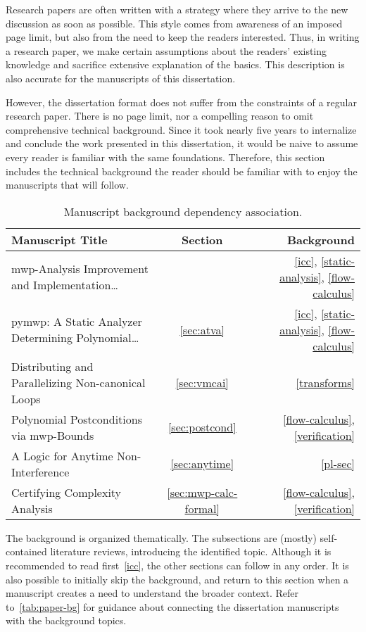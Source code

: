 
Research papers are often written with a strategy where they arrive to the new discussion as soon as possible.
This style comes from awareness of an imposed page limit, but also from the need to keep the readers interested.
Thus, in writing a research paper, we make certain assumptions about the readers' existing knowledge and sacrifice extensive explanation of the basics.
This description is also accurate for the manuscripts of this dissertation.

However, the dissertation format does not suffer from the constraints of a regular research paper.
There is no page limit, nor a compelling reason to omit comprehensive technical background.
Since it took nearly five years to internalize and conclude the work presented in this dissertation, it would be naive to assume every reader is familiar with the same foundations.
Therefore, this section includes the technical background the reader should be familiar with to enjoy the manuscripts that will follow.

\begin{table}[h!]
\begin{NiceTabularX}{\linewidth}{@{}Xcr@{}}
\toprule
\textbf{Manuscript Title} & \textbf{Section} & \textbf{Background} \\
\midrule
{mwp-Analysis Improvement and Implementation\ldots} &  & \ref{icc}, \ref{static-analysis}, \ref{flow-calculus} \\
{pymwp: A Static Analyzer Determining Polynomial\ldots} & \ref{sec:atva} & \ref{icc}, \ref{static-analysis}, \ref{flow-calculus} \\
{Distributing and Parallelizing Non-canonical Loops} & \ref{sec:vmcai} & \ref{transforms} \\
{Polynomial Postconditions via mwp-Bounds} & \ref{sec:postcond} & \ref{flow-calculus}, \ref{verification} \\
{A Logic for Anytime Non-Interference} & \ref{sec:anytime} & \ref{pl-sec} \\
{Certifying Complexity Analysis} & \ref{sec:mwp-calc-formal} & \ref{flow-calculus}, \ref{verification} \\
\bottomrule
\end{NiceTabularX}
\caption[Manuscript background dependency association]{Manuscript background dependency association.}
\label{tab:paper-bg}
\end{table}

The background is organized thematically.
The subsections are (mostly) self-contained literature reviews, introducing the identified topic.
Although it is recommended to read first~\autoref{icc}, the other sections can follow in any order.
It is also possible to initially skip the background, and return to this section when a manuscript creates a need to understand the broader context.
Refer to~\autoref{tab:paper-bg} for guidance about connecting the dissertation manuscripts with the background topics.
